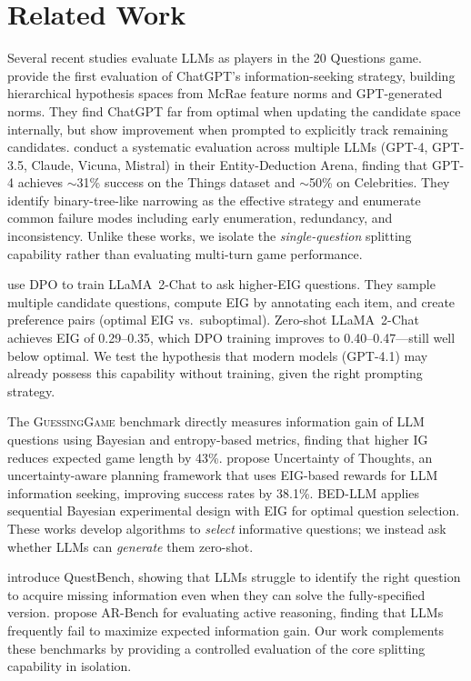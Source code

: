 \section{Related Work}
\label{sec:related}

Several recent studies evaluate LLMs as players in the 20 Questions game.
\citet{bertolazzi2023chatgpt} provide the first evaluation of ChatGPT's information-seeking strategy, building hierarchical hypothesis spaces from McRae feature norms and GPT-generated norms.
They find ChatGPT far from optimal when updating the candidate space internally, but show improvement when prompted to explicitly track remaining candidates.
\citet{zhang2024probing} conduct a systematic evaluation across multiple LLMs (GPT-4, GPT-3.5, Claude, Vicuna, Mistral) in their Entity-Deduction Arena, finding that GPT-4 achieves $\sim$31\% success on the Things dataset and $\sim$50\% on Celebrities.
They identify binary-tree-like narrowing as the effective strategy and enumerate common failure modes including early enumeration, redundancy, and inconsistency.
Unlike these works, we isolate the \emph{single-question} splitting capability rather than evaluating multi-turn game performance.

\citet{mazzaccara2024learning} use DPO to train LLaMA~2-Chat to ask higher-EIG questions.
They sample multiple candidate questions, compute EIG by annotating each item, and create preference pairs (optimal EIG vs.\ suboptimal).
Zero-shot LLaMA~2-Chat achieves EIG of 0.29--0.35, which DPO training improves to 0.40--0.47---still well below optimal.
We test the hypothesis that modern models (GPT-4.1) may already possess this capability without training, given the right prompting strategy.

The \textsc{GuessingGame} benchmark \citep{guessinggame2025} directly measures information gain of LLM questions using Bayesian and entropy-based metrics, finding that higher IG reduces expected game length by 43\%.
\citet{hu2024uncertainty} propose Uncertainty of Thoughts, an uncertainty-aware planning framework that uses EIG-based rewards for LLM information seeking, improving success rates by 38.1\%.
\textsc{BED-LLM} \citep{bedllm2025} applies sequential Bayesian experimental design with EIG for optimal question selection.
These works develop algorithms to \emph{select} informative questions; we instead ask whether LLMs can \emph{generate} them zero-shot.

\citet{li2025questbench} introduce QuestBench, showing that LLMs struggle to identify the right question to acquire missing information even when they can solve the fully-specified version.
\citet{zhou2025active} propose AR-Bench for evaluating active reasoning, finding that LLMs frequently fail to maximize expected information gain.
Our work complements these benchmarks by providing a controlled evaluation of the core splitting capability in isolation.
